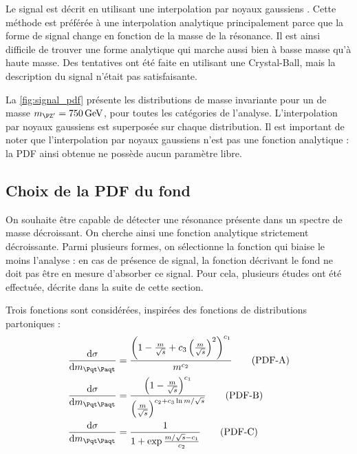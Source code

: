 Le signal est décrit en utilisant une interpolation par noyaux gaussiens \citep{Cranmer:2000du}. Cette méthode est préférée à une interpolation analytique principalement parce que la forme de signal change en fonction de la masse de la résonance. Il est ainsi difficile de trouver une forme analytique qui marche aussi bien à basse masse qu'à haute masse. Des tentatives ont été faite en utilisant une Crystal-Ball, mais la description du signal n'était pas satisfaisante.

\medskip

La \cref{fig:signal_pdf} présente les distributions de masse invariante pour un \zprime de masse $\mzp = \SI{750}{\GeV}$, pour toutes les catégories de l'analyse. L'interpolation par noyaux gaussiens est superposée sur chaque distribution. Il est important de noter que l'interpolation par noyaux gaussiens n'est pas une fonction analytique : la PDF ainsi obtenue ne possède aucun paramètre libre.

\subsection{Choix de la PDF du fond}

On souhaite être capable de détecter une résonance présente dans un spectre de masse décroissant. On cherche ainsi une fonction analytique strictement décroissante. Parmi plusieurs formes, on sélectionne la fonction qui biaise le moins l'analyse : en cas de présence de signal, la fonction décrivant le fond ne doit pas être en mesure d'absorber ce signal. Pour cela, plusieurs études ont été effectuée, décrite dans la suite de cette section.

\medskip

Trois fonctions sont considérées, inspirées des fonctions de distributions partoniques :
\begin{align}
  \frac{\mathrm{d}\sigma}{\mathrm{d}\mtt} &= \frac{\left( 1 - \frac{m}{\sqrt{s}} + c_3 \left( \frac{m}{\sqrt{s}} \right)^2 \right)^{c_1}}{m^{c_2}} \tag{PDF-A} \label{pdfA} \\
  \frac{\mathrm{d}\sigma}{\mathrm{d}\mtt} &= \frac{\left( 1 - \frac{m}{\sqrt{s}} \right)^{c_1} }{ \left( \frac{m}{\sqrt{s}}  \right)^{c_2 + c_3\ln{m / \sqrt{s}}}} \tag{PDF-B} \label{pdfB} \\
  \frac{\mathrm{d}\sigma}{\mathrm{d}\mtt} &= \frac{1}{1 + \exp{\frac{m / \sqrt{s} - c_1}{c_2}}} \tag{PDF-C} \label{pdfC}
\end{align}

